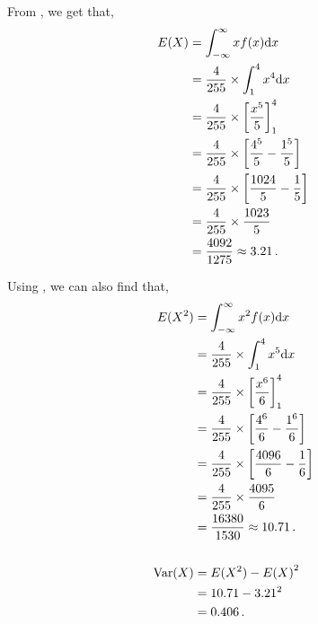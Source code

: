 \begin{subquestions}
\begin{subsubquestions}

\subsubquestion

From , we get that,
\begin{align}
	E(X) & = \int_{-\infty}^{\infty} x f(x)\mathrm{d}x \nonumber \\
	     & = \frac{4}{255} \times \int_{1}^{4} x^4 \mathrm{d}x \nonumber \\
	     & = \frac{4}{255} \times \left[\frac{x^5}{5}\right]^4_1 \nonumber \\
	     & = \frac{4}{255} \times \left[\frac{4^5}{5} - \frac{1^5}{5}\right] \nonumber \\
	     & = \frac{4}{255} \times \left[\frac{1024}{5} - \frac{1}{5}\right] \nonumber \\
	     & = \frac{4}{255} \times \frac{1023}{5} \nonumber \\
	     & = \frac{4092}{1275} \approx 3.21 \,. 
\end{align}

Using , we can also find that,
\begin{align}
	E(X^2) & = \int_{-\infty}^{\infty} x^2 f(x)\mathrm{d}x \nonumber \\
	& = \frac{4}{255} \times \int_{1}^{4} x^5 \mathrm{d}x \nonumber \\
	& = \frac{4}{255} \times \left[\frac{x^6}{6}\right]^4_1 \nonumber \\
	& = \frac{4}{255} \times \left[\frac{4^6}{6} - \frac{1^6}{6}\right] \nonumber \\
	& = \frac{4}{255} \times \left[\frac{4096}{6} - \frac{1}{6}\right] \nonumber \\
	& = \frac{4}{255} \times \frac{4095}{6} \nonumber \\
	& = \frac{16380}{1530} \approx 10.71 \,. \\ \nonumber \\
	\text{Var}(X) & = E(X^2) - {E(X)}^2 \nonumber \\
	              & = 10.71 - 3.21^2 \nonumber \\
	              & = 0.406 \,.	
\end{align}

\end{subsubquestions}
	

\subquestion


\end{subquestions}
